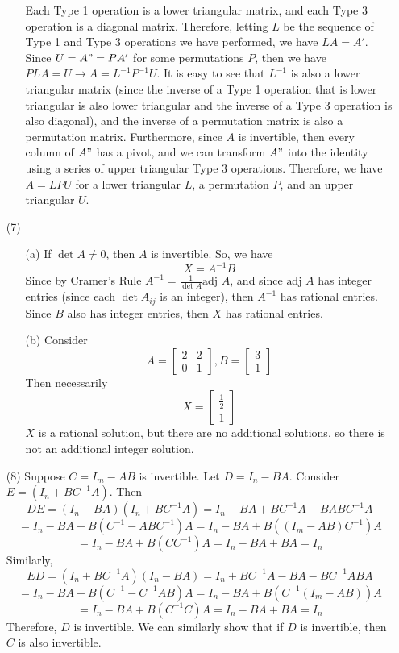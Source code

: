\documentclass[12pt]{article}
\begin{document}
\begin{itemize}
\begin{itemize}
Each Type 1 operation is a lower triangular matrix, and each Type 3 operation is a diagonal matrix. Therefore, letting $L$ be the sequence of Type 1 and Type 3 operations we have performed, we have $LA = A'$. Since $U = A" = PA'$ for some permutations $P$, then we have $PLA = U \rightarrow A = L^{-1}P^{-1}U$. It is easy to see that $L^{-1}$ is also a lower triangular matrix (since the inverse of a Type 1 operation that is lower triangular is also lower triangular and the inverse of a Type 3 operation is also diagonal), and the inverse of a permutation matrix is also a permutation matrix. Furthermore, since $A$ is invertible, then every column of $A"$ has a pivot, and we can transform $A"$ into the identity using a series of upper triangular Type 3 operations. Therefore, we have $A = LPU$ for a lower triangular $L$, a permutation $P$, and an upper triangular $U$.
\end{itemize}
\item[(7)]
\begin{itemize}
\item[(a)]
If $\det A \neq 0$, then $A$ is invertible. So, we have
$$X = A^{-1}B$$
Since by Cramer's Rule $A^{-1} = \frac{1}{\det A}\text{adj }A$, and since $\text{adj }A$ has integer entries (since each $\det A_{ij}$ is an integer), then $A^{-1}$ has rational entries. Since $B$ also has integer entries, then $X$ has rational entries.
\item[(b)]
Consider
$$A = \begin{bmatrix}
2 & 2 \\
0 & 1
\end{bmatrix}, B = \begin{bmatrix}
3 \\
1
\end{bmatrix}$$
Then necessarily
$$X = \begin{bmatrix}
\frac{1}{2} \\
1
\end{bmatrix}$$
$X$ is a rational solution, but there are no additional solutions, so there is not an additional integer solution.
\end{itemize}
\item[(8)]
Suppose $C = I_m - AB$ is invertible. Let $D = I_n - BA$. Consider $E = (I_n + BC^{-1}A)$. Then
$$DE = (I_n - BA)(I_n + BC^{-1}A) = I_n - BA + BC^{-1}A - BABC^{-1}A$$
$$= I_n - BA + B(C^{-1} - ABC^{-1})A = I_n - BA + B((I_m - AB)C^{-1})A$$
$$= I_n - BA + B(CC^{-1})A = I_n - BA + BA = I_n$$
Similarly,
$$ED = (I_n + BC^{-1}A)(I_n - BA) = I_n + BC^{-1}A - BA - BC^{-1}ABA$$
$$= I_n - BA + B(C^{-1} - C^{-1}AB)A = I_n - BA + B(C^{-1}(I_m - AB))A$$
$$= I_n - BA + B(C^{-1}C)A = I_n - BA + BA = I_n$$
Therefore, $D$ is invertible. We can similarly show that if $D$ is invertible, then $C$ is also invertible.
\end{itemize}
\end{document}
